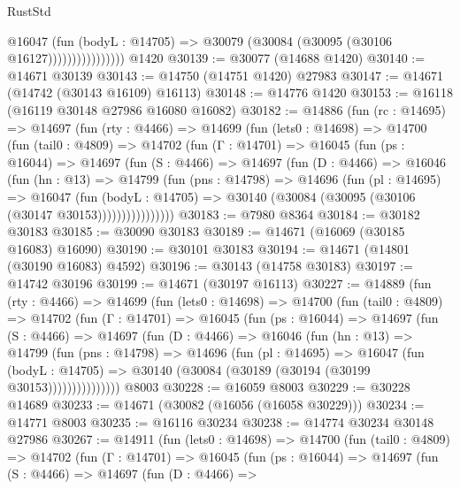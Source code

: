 \begin{lexlean}{RustStd}
\begin{coremodule}
                          @16047
                            (fun (bodyL : @14705) =>
                            @30079 (@30084 (@30095 (@30106 @16127))))))))))))))))
    @1420
@30139 := @30077 (@14688 @1420)
@30140 := @14671 @30139
@30143 := @14750 (@14751 @1420) @27983
@30147 := @14671 (@14742 (@30143 @16109) @16113)
@30148 := @14776 @1420
@30153 := @16118 (@16119 @30148 @27986 @16080 @16082)
@30182 := @14886
    (fun (rc : @14695) =>
    @14697
      (fun (rty : @4466) =>
      @14699
        (fun (lets0 : @14698) =>
        @14700
          (fun (tail0 : @4809) =>
          @14702
            (fun (Γ : @14701) =>
            @16045
              (fun (ps : @16044) =>
              @14697
                (fun (S : @4466) =>
                @14697
                  (fun (D : @4466) =>
                  @16046
                    (fun (hn : @13) =>
                    @14799
                      (fun (pns : @14798) =>
                      @14696
                        (fun (pl : @14695) =>
                        @16047
                          (fun (bodyL : @14705) =>
                          @30140 (@30084 (@30095 (@30106 (@30147 @30153))))))))))))))))
@30183 := @7980 @8364
@30184 := @30182 @30183
@30185 := @30090 @30183
@30189 := @14671 (@16069 (@30185 @16083) @16090)
@30190 := @30101 @30183
@30194 := @14671 (@14801 (@30190 @16083) @4592)
@30196 := @30143 (@14758 @30183)
@30197 := @14742 @30196
@30199 := @14671 (@30197 @16113)
@30227 := @14889
    (fun (rty : @4466) =>
    @14699
      (fun (lets0 : @14698) =>
      @14700
        (fun (tail0 : @4809) =>
        @14702
          (fun (Γ : @14701) =>
          @16045
            (fun (ps : @16044) =>
            @14697
              (fun (S : @4466) =>
              @14697
                (fun (D : @4466) =>
                @16046
                  (fun (hn : @13) =>
                  @14799
                    (fun (pns : @14798) =>
                    @14696
                      (fun (pl : @14695) =>
                      @16047
                        (fun (bodyL : @14705) =>
                        @30140 (@30084 (@30189 (@30194 (@30199 @30153)))))))))))))))
    @8003
@30228 := @16059 @8003
@30229 := @30228 @14689
@30233 := @14671 (@30082 (@16056 (@16058 @30229)))
@30234 := @14771 @8003
@30235 := @16116 @30234
@30238 := @14774 @30234 @30148 @27986
@30267 := @14911
    (fun (lets0 : @14698) =>
    @14700
      (fun (tail0 : @4809) =>
      @14702
        (fun (Γ : @14701) =>
        @16045
          (fun (ps : @16044) =>
          @14697
            (fun (S : @4466) =>
            @14697
              (fun (D : @4466) =>

\end{coremodule}
\end{lexlean}
